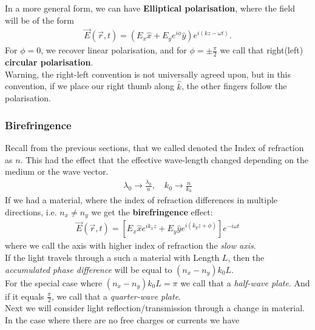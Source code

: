 In a more general form, we can have \textbf{Elliptical polarisation}, where the field will be of the form
\begin{align*}
				\vec{E}(\vec{r},t) = \left(E_x \hat{x} + E_ye^{i\phi}\hat{y}\right) e^{i(kz - \omega t)}.
\end{align*}
For $\phi = 0$, we recover linear polarisation, and for $\phi = \pm \frac{\pi}{2}$ we call that right(left) \textbf{circular polarisation}.\\
Warning, the right-left convention is not universally agreed upon, but in this convention, if we place our right thumb along $\hat{k}$, the other fingers follow the polarisation.\\


\subsubsection{Birefringence}
Recall from the previous sections, that we called denoted the Index of refraction as $n$. This had the effect that the effective wave-length changed depending on the medium or the wave vector.
\begin{align*}
\lambda_0 \to \frac{\lambda_0}{n}, \quad k_0 \to \frac{n}{k_0}
\end{align*}
If we had a material, where the index of refraction differences in multiple directions, i.e. $n_x \neq n_y$ we get the \textbf{birefringence}  effect:
\begin{align*}
		\vec{E}(\vec{r},t) = \left[E_x \hat{x} e^{ik_xz} + E_y \hat{y}e^{i(k_yz + \phi)}\right]e^{-i\omega t}
\end{align*}
where we call the axis with higher index of refraction the \emph{slow axis}.\\
If the light travels through a such a material with Length $L$, then the \emph{accumulated phase difference} will be equal to $(n_x - n_y)k_0L$.\\

For the special case where $(n_x - n_y)k_0L = \pi$ we call that a \emph{half-wave plate}. And if it equals $\frac{\pi}{2}$, we call that a \emph{quarter-wave plate}.\\


Next we will consider light reflection/transmission through a change in material. In the case where there are no free charges or currents we have

